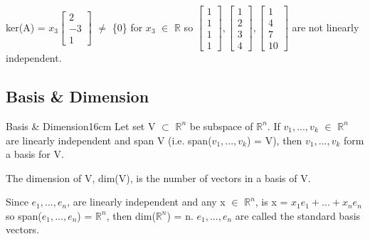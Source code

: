 \begin{tbox}
        ker(A) =
        \scriptsize
        $x_3\begin{bmatrix}
            2 \\
            -3 \\
            1
        \end{bmatrix}$
        \normalsize
        $\not =$ \{0\}
        for $x_3$ $\in$ $\mathbb{R}$ so
        \scriptsize
        $\begin{bmatrix}
            1 \\
            1 \\
            1 \\
            1
        \end{bmatrix},
        \begin{bmatrix}
            1 \\
            2 \\
            3 \\
            4
        \end{bmatrix},
        \begin{bmatrix}
            1 \\
            4 \\
            7 \\
            10
        \end{bmatrix}$
        \normalsize
        are not linearly independent.
    \end{tbox}

    \vspace{0.5cm}





\subsection{ Basis \& Dimension }

    \begin{definition}{Basis \& Dimension}{16cm}
        Let set V $\subset$ $\mathbb{R}^n$ be subspace of $\mathbb{R}^n$.
        If $v_1,...,v_k$ $\in$ $\mathbb{R}^n$ are linearly independent and span V
        (i.e. span($v_1,...,v_k$) = V), then $v_1,...,v_k$ form
        a {\color{lblue} basis} for V.

        The {\color{lblue} dimension} of V, dim(V), is the number of vectors in
        a basis of V.

        Since $e_1,...,e_n$, are linearly independent
        and any x $\in$ $\mathbb{R}^n$, is x = $x_1e_1 + ... + x_ne_n$
        so span($e_1,...,e_n$) = $\mathbb{R}^n$, then dim($\mathbb{R}^n$) = n.
        $e_1,...,e_n$ are called the {\color{lblue} standard basis vectors}.
    \end{definition}

